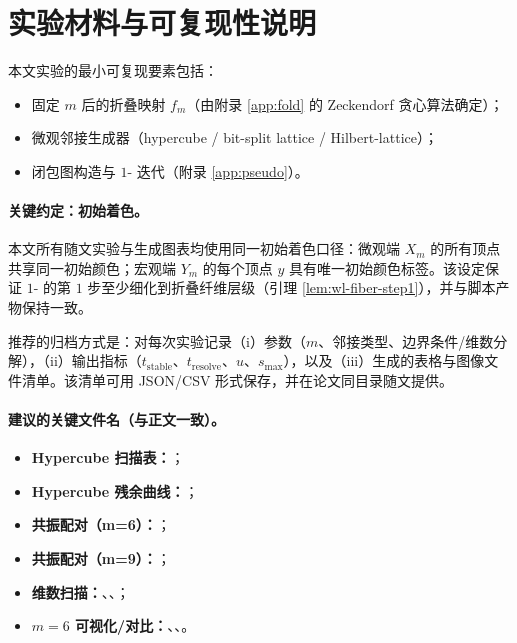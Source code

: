 
\section{实验材料与可复现性说明}
\label{app:repro}

本文实验的最小可复现要素包括：
\begin{itemize}
  \item 固定 $m$ 后的折叠映射 $f_m$（由附录 \ref{app:fold} 的 Zeckendorf 贪心算法确定）；
  \item 微观邻接生成器（hypercube / bit-split lattice / Hilbert-lattice）；
  \item 闭包图构造与 $1$-\WL{} 迭代（附录 \ref{app:pseudo}）。
\end{itemize}

\paragraph{关键约定：初始着色。}
本文所有随文实验与生成图表均使用同一初始着色口径：微观端 $X_m$ 的所有顶点共享同一初始颜色；宏观端 $Y_m$ 的每个顶点 $y$ 具有唯一初始颜色标签。该设定保证 $1$-\WL{} 的第 $1$ 步至少细化到折叠纤维层级（引理 \ref{lem:wl-fiber-step1}），并与脚本产物保持一致。

推荐的归档方式是：对每次实验记录（i）参数（$m$、邻接类型、边界条件/维数分解），（ii）输出指标（$t_{\mathrm{stable}}$、$t_{\mathrm{resolve}}$、$u$、$s_{\max}$），以及（iii）生成的表格与图像文件清单。该清单可用 JSON/CSV 形式保存，并在论文同目录随文提供。

\paragraph{建议的关键文件名（与正文一致）。}
\begin{itemize}
  \item \textbf{Hypercube 扫描表：}；
  \item \textbf{Hypercube 残余曲线：}；
  \item \textbf{共振配对（m=6）：}；
  \item \textbf{共振配对（m=9）：}；
  \item \textbf{维数扫描：}、、；
  \item \textbf{$m=6$ 可视化/对比：}、、。
\end{itemize}

